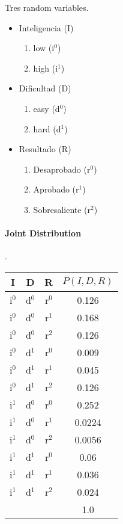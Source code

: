 

Tres random variables.

\begin{itemize}
 \item Inteligencia (I)
 \begin{enumerate}
  \item low (i$^0$)
  \item high (i$^1$)
 \end{enumerate}
 \item Dificultad (D)
 \begin{enumerate}
  \item easy (d$^0$)
  \item hard (d$^1$)
 \end{enumerate}
 \item Resultado (R)
 \begin{enumerate}
  \item Desaprobado (r$^0$)
  \item Aprobado (r$^1$)
  \item Sobresaliente (r$^2$)
 \end{enumerate}
\end{itemize}

\paragraph{Joint Distribution} .

 \begin{tabular}{|c|c|c|c|}
 \hline
 I & D & R & $P(I,D,R)$ \\ \hline
 i$^0$ & d$^0$ & r$^0$ & 0.126 \\ \hline
 i$^0$ & d$^0$ & r$^1$ & 0.168 \\ \hline
 i$^0$ & d$^0$ & r$^2$ & 0.126 \\ \hline
 i$^0$ & d$^1$ & r$^0$ & 0.009 \\ \hline
 i$^0$ & d$^1$ & r$^1$ & 0.045 \\ \hline
 i$^0$ & d$^1$ & r$^2$ & 0.126 \\ \hline
 i$^1$ & d$^0$ & r$^0$ & 0.252 \\ \hline
 i$^1$ & d$^0$ & r$^1$ & 0.0224 \\ \hline
 i$^1$ & d$^0$ & r$^2$ & 0.0056 \\ \hline
 i$^1$ & d$^1$ & r$^0$ & 0.06 \\ \hline
 i$^1$ & d$^1$ & r$^1$ & 0.036 \\ \hline
 i$^1$ & d$^1$ & r$^2$ & 0.024 \\ \hline \hline
         &         &         & 1.0     \\ \hline
 \end{tabular}

